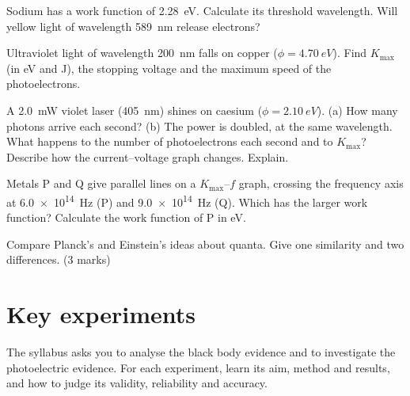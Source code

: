 \begin{quickcheck}
  \item Sodium has a work function of \qty{2.28}{eV}. Calculate its threshold
        wavelength. Will yellow light of wavelength \qty{589}{nm} release electrons?
  \item Ultraviolet light of wavelength \qty{200}{nm} falls on copper
        ($\phi = \qty{4.70}{eV}$). Find $K_\mathrm{max}$ (in eV and J), the stopping
        voltage and the maximum speed of the photoelectrons.\label{ch3:qc:copper}
  \item A \qty{2.0}{mW} violet laser (\qty{405}{nm}) shines on caesium
        ($\phi = \qty{2.10}{eV}$). (a) How many photons arrive each second? (b) The
        power is doubled, at the same wavelength. What happens to the number of
        photoelectrons each second and to $K_\mathrm{max}$? Describe how the
        current--voltage graph changes. Explain.
  \item Metals P and Q give parallel lines on a $K_\mathrm{max}$--$f$ graph, crossing
        the frequency axis at \qty{6.0e14}{Hz} (P) and \qty{9.0e14}{Hz} (Q). Which
        has the larger work function? Calculate the work function of P in eV.
  \item Compare Planck's and Einstein's ideas about quanta. Give one similarity and
        two differences. (3 marks)\label{ch3:qc:planckeinstein}
\end{quickcheck}

\section{Key experiments}\label{ch3:sec:experiments}

The syllabus asks you to analyse the black body evidence and to investigate the
photoelectric evidence. For each experiment, learn its aim, method and results, and
how to judge its validity, reliability and accuracy.

